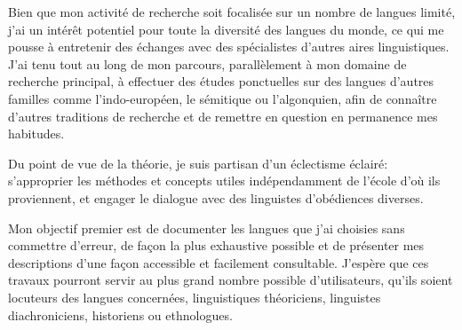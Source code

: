 \documentclass[oldfontcommands,oneside,a4paper,11pt]{memoir}
\begin{document}
Bien que mon activité de recherche soit focalisée sur un nombre de langues limité, j'ai un intérêt potentiel pour toute la diversité des langues du monde, ce qui me pousse à entretenir des échanges avec des spécialistes d'autres aires linguistiques. J'ai tenu tout au long de mon parcours, parallèlement à mon domaine de recherche  principal,  à effectuer des études ponctuelles sur des langues d'autres familles comme l'indo-européen, le sémitique ou l'algonquien, afin de connaître    d'autres traditions de recherche et de remettre en question en permanence mes habitudes.

 
Du point de vue de la théorie, je suis partisan d'un éclectisme éclairé: s'approprier  les méthodes et concepts utiles  indépendamment de l'école d'où ils proviennent, et engager le dialogue avec des linguistes d'obédiences diverses. 

Mon objectif  premier est de documenter les langues que j'ai choisies sans commettre d'erreur, de façon la plus exhaustive possible et de présenter mes descriptions d'une façon accessible et facilement consultable. J'espère que ces travaux pourront servir au plus grand nombre possible d'utilisateurs, qu'ils soient locuteurs des langues concernées, linguistiques théoriciens, linguistes diachroniciens, historiens ou ethnologues.



\pagebreak
	\tableofcontents
\end{document}
